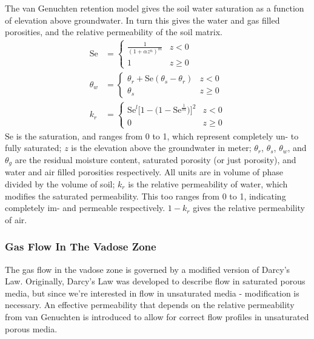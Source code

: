 The van Genuchten retention model gives the soil water saturation as a function of elevation above groundwater.
In turn this gives the water and gas filled porosities, and the relative permeability of the soil matrix.
\begin{align}
  \mathrm{Se} &=
    \begin{cases}\label{eq:van_genuchten_saturation}
      \frac{1}{(1 + \alpha z^n)^m} & z < 0 \\
    1 & z \geq 0
    \end{cases} \\
  \theta_w &=
    \begin{cases}\label{eq:van_genuchten_soil_moisture}
      \theta_r + \mathrm{Se}(\theta_s - \theta_r) & z < 0 \\
      \theta_s & z \geq 0
    \end{cases} \\
  k_r &=
    \begin{cases}\label{eq:van_genuchten_relative_permeability}
      \mathrm{Se}^l \big[ 1 - \big( 1 - \mathrm{Se}^\frac{1}{m} \big) \big]^2 & z < 0 \\
      0 & z \geq 0
    \end{cases}
\end{align}
$\mathrm{Se}$ is the saturation, and ranges from 0 to 1, which represent completely un- to fully saturated;
$z$ is the elevation above the groundwater in meter;
$\theta_r$, $\theta_s$, $\theta_w$, and $\theta_g$ are the residual moisture content, saturated porosity (or just porosity), and water and air filled porosities respectively. All units are in volume of phase divided by the volume of soil;
$k_r$ is the relative permeability of water, which modifies the saturated permeability. This too ranges from 0 to 1, indicating completely im- and permeable respectively. $1-k_r$ gives the relative permeability of air.\par

\subsubsection{Gas Flow In The Vadose Zone}

The gas flow in the vadose zone is governed by a modified version of Darcy's Law.
Originally, Darcy's Law was developed to describe flow in saturated porous media, but since we're interested in flow in unsaturated media - modification is necessary.
An effective permeability that depends on the relative permeability from van Genuchten is introduced to allow for correct flow profiles in unsaturated porous media.\par

